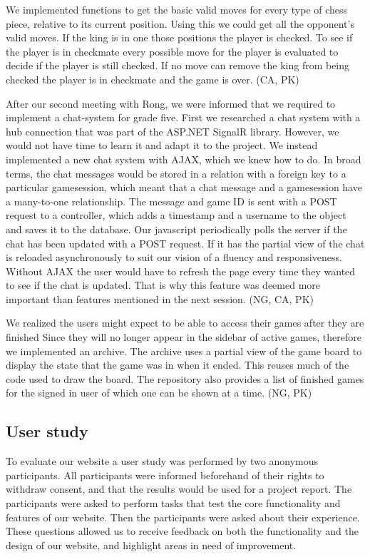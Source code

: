 \documentclass[acmlarge, review=false, screen=true]{acmart}
\begin{document}
    We implemented functions to get the basic valid moves for every type of chess piece, relative to its current position. Using this we could get all the opponent’s valid moves. If the king is in one those positions the player is checked. To see if the player is in checkmate every possible move for the player is evaluated to decide if the player is still checked. If no move can remove the king from being checked the player is in checkmate and the game is over. (CA, PK)
    
    After our second meeting with Rong, we were informed that we required to implement a chat-system for grade five. First we researched a chat system with a hub connection that was part of the ASP.NET SignalR library\cite{signalr}. However, we would not have time to learn it and adapt it to the project. We instead implemented a new chat system with AJAX, which we knew how to do. In broad terms, the chat messages would be stored in a relation with a foreign key to a particular gamesession, which meant that a chat message and a gamesession have a many-to-one relationship. The message and game ID is sent with a POST request to a controller, which adds a timestamp and a username to the object and saves it to the database. Our javascript periodically polls the server if the chat has been updated with a POST request. If it has the partial view of the chat is reloaded asynchronously to suit our vision of a fluency and responsiveness. Without AJAX the user would have to refresh the page every time they wanted to see if the chat is updated. That is why this feature was deemed more important than features mentioned in the next session. (NG, CA, PK)

    We realized the users might expect to be able to access their games after they are finished Since they will no longer appear in the sidebar of active games, therefore we implemented an archive. The archive uses a partial view of the game board to display the state that the game was in when it ended. This reuses much of the code used to draw the board. The repository also provides a list of finished games for the signed in user of which one can be shown at a time. (NG, PK)



  \subsection{User study}
    To evaluate our website a user study was performed by two anonymous participants. All participants were informed beforehand of their rights to withdraw consent, and that the results would be used for a project report. The participants were asked to perform tasks that test the core functionality and features of our website. Then the participants were asked about their experience. These questions allowed us to receive feedback on both the functionality and the design of our website, and highlight areas in need of improvement. 
\end{document}
